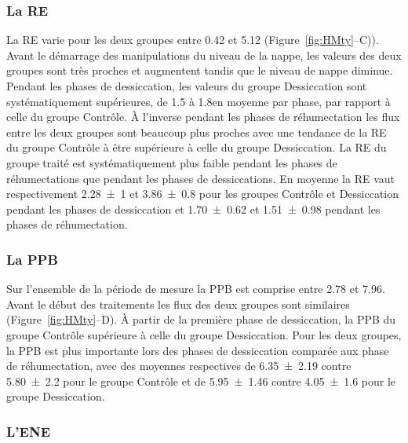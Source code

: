 \subsubsection{La RE}

La RE varie pour les deux groupes entre \num{0.42} et \SI{5.12}{\uml} (Figure~\ref{fig:HMty}--C)).
Avant le démarrage des manipulations du niveau de la nappe, les valeurs des deux groupes sont très proches et augmentent tandis que le niveau de nappe diminue.
Pendant les phases de dessiccation, les valeurs du groupe Dessiccation sont systématiquement supérieures, de \num{1.5} à \SI{1.8}{\uml}en moyenne par phase, par rapport à celle du groupe Contrôle.
À l'inverse pendant les phases de réhumectation les flux entre les deux groupes sont beaucoup plus proches avec une tendance de la RE du groupe Contrôle à être supérieure à celle du groupe Dessiccation.
La RE du groupe traité est systématiquement plus faible pendant les phases de réhumectations que pendant les phases de dessiccations.
En moyenne la RE vaut respectivement \num{2.28(100)} et \SI{3.86(080)}{\uml} pour les groupes Contrôle et Dessiccation pendant les phases de dessiccation et \num{1.70(062)} et \SI{1.51(098)}{\uml} pendant les phases de réhumectation.
\subsubsection{La PPB}

Sur l'ensemble de la période de mesure la PPB est comprise entre \num{2.78} et \SI{7.96}{\uml}.
Avant le début des traitements les flux des deux groupes sont similaires (Figure~\ref{fig:HMty}--D).
À partir de la première phase de dessiccation, la PPB du groupe Contrôle supérieure à celle du groupe Dessiccation.
Pour les deux groupes, la PPB est plus importante lors des phases de dessiccation comparée aux phase de réhumectation, avec des moyennes respectives de \num{6.35(219)} contre \num{5.80(220)} pour le groupe Contrôle et de \num{5.95(146)} contre \SI{4.05(160)}{\uml} pour le groupe Dessiccation.

\subsubsection{L'ENE}


